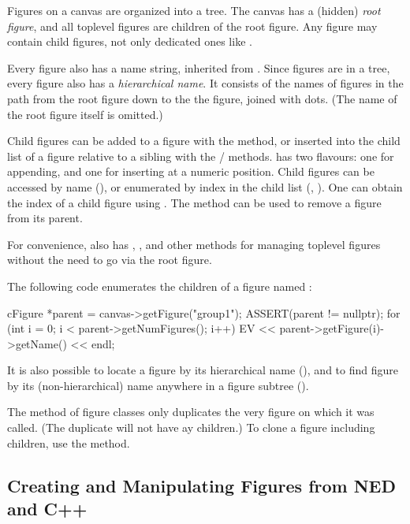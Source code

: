 Figures on a canvas are organized into a tree. The canvas has a
(hidden) \textit{root figure}, and all toplevel figures are
children of the root figure. Any figure may contain child figures,
not only dedicated ones like .

Every figure also has a name string, inherited from .
Since figures are in a tree, every figure also has a \textit{hierarchical name}.
It consists of the names of figures in the path from the root figure down to the
the figure, joined with dots. (The name of the root figure itself is omitted.)

Child figures can be added to a figure with the  method, or
inserted into the child list of a figure relative to a sibling with the
 /  methods.
 has two flavours: one for appending, and one for inserting
at a numeric position. Child figures can be accessed by name
(), or enumerated by index in the child list
(, ). One can obtain the index of a
child figure using  . The  method
can be used to remove a figure from its parent.

For convenience,  also has ,
,  and other methods for managing
toplevel figures without the need to go via the root figure.

The following code enumerates the children of a figure named :

\begin{cpp}
cFigure *parent = canvas->getFigure("group1");
ASSERT(parent != nullptr);
for (int i = 0; i < parent->getNumFigures(); i++)
    EV << parent->getFigure(i)->getName() << endl;
\end{cpp}

It is also possible to locate a figure by its hierarchical name
(), and to find figure by its (non-hierarchical)
name anywhere in a figure subtree ().

The  method of figure classes only duplicates the very figure
on which it was called. (The duplicate will not have ay children.) To clone
a figure including children, use the  method.


\subsection{Creating and Manipulating Figures from NED and C++}
\label{sec:graphics:creating-and-manipulating-figures}

